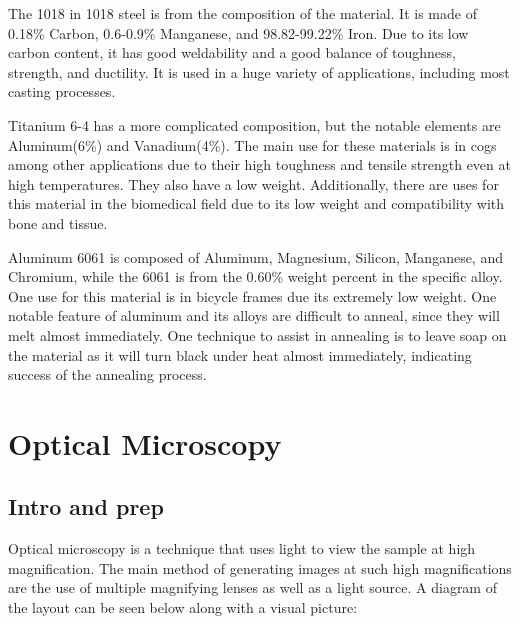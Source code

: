 \documentclass{article}
\begin{document}
The 1018 in 1018 steel is from the composition of the material. It is made of 0.18\% Carbon, 0.6-0.9\% Manganese, and 98.82-99.22\% Iron. Due to its low carbon content, it has good weldability and a good balance of toughness, strength, and ductility. It is used in a huge variety of applications, including most casting processes.

Titanium 6-4 has a more complicated composition, but the notable elements are Aluminum(6\%) and Vanadium(4\%). The main use for these materials is in cogs among other applications due to their high toughness and tensile strength even at high temperatures. They also have a low weight. Additionally, there are uses for this material in the biomedical field due to its low weight and compatibility with bone and tissue.

Aluminum 6061 is composed of Aluminum, Magnesium, Silicon, Manganese, and Chromium, while the 6061 is from the 0.60\% weight percent in the specific alloy. One use for this material is in bicycle frames due its extremely low weight. One notable feature of aluminum and its alloys are difficult to anneal, since they will melt almost immediately. One technique to assist in annealing is to leave soap on the material as it will turn black under heat almost immediately, indicating success of the annealing process.

\section{Optical Microscopy}

\subsection{Intro and prep}

Optical microscopy is a technique that uses light to view the sample at high magnification. The main method of generating images at such high magnifications are the use of multiple magnifying lenses as well as a light source. A diagram of the layout can be seen below along with a visual picture:
\end{document}
